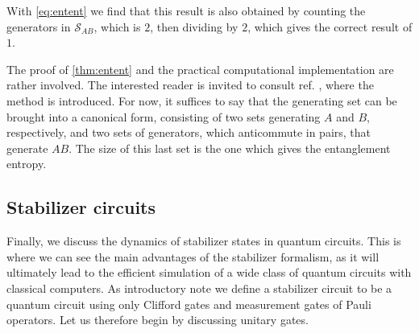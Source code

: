 With \cref{eq:entent} we find that this result is also obtained by counting the
generators in $\mathcal{S}_{AB}$, which is $2$, then dividing by $2$, which
gives the correct result of $1$. 

The proof of \cref{thm:entent} and the practical computational implementation
are rather involved. The interested reader is invited to consult ref.
\cite{fattalEntanglementStabilizerFormalism2004}, where the method is
introduced. For now, it suffices to say that the generating set can be brought
into a canonical form, consisting of two sets generating $A$ and $B$,
respectively, and two sets of generators, which anticommute in pairs, that
generate $AB$. The size of this last set is the one which gives the
entanglement entropy.

\subsection{Stabilizer circuits}

Finally, we discuss the dynamics of stabilizer states in quantum circuits. This
is where we can see the main advantages of the stabilizer formalism, as it will
ultimately lead to the efficient simulation of a wide class of quantum circuits
with classical computers. 
As introductory note we define a stabilizer circuit to be a quantum
circuit using only Clifford gates and measurement gates of Pauli operators. Let
us therefore begin by discussing unitary gates.

